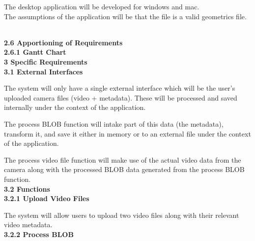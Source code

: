 \documentclass[10pt,draftclsnofoot,onecolumn]{IEEEtran}
\begin{document}
        The desktop application will be developed for windows and mac.\\
        	\vspace{2mm}
The assumptions of the application will be that the file is a valid geometrics file. 
        
        \\
        			\vspace{5mm}
{\Medium\textbf{2.6 Apportioning of Requirements}} \\
					\vspace{5mm}
{\Medium\textbf{2.6.1 Gantt Chart}} \\

        
        			\vspace{5mm}
{\Large\textbf{3 Specific Requirements}}\\
\vspace{5mm}
{\Medium\textbf{3.1 External Interfaces}} \\
\vspace{5mm}

The system will only have a single external interface which will be the user’s uploaded camera files (video + metadata). These will be processed and saved internally under the context of the application.\\
\vspace{2mm}


The process BLOB function will intake part of this data (the metadata), transform it, and save it either in memory or to an external file under the context of the application.\\
\vspace{2mm}


The process video file function will make use of the actual video data from the camera along with the processed BLOB data generated from the process BLOB function.\\

\vspace{5mm}
{\Medium\textbf{3.2 Functions}} \\
\vspace{5mm}
\textbf{{3.2.1 Upload Video Files}} \\
\vspace{5mm}

 
 The system will allow users to upload two video files along with their relevant video metadata.\\
 \vspace{5mm}
\textbf{{3.2.2 Process BLOB}} \\
\vspace{5mm}
\end{document}
